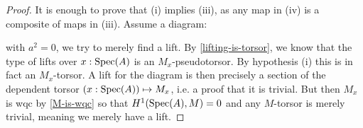 \begin{proof}
It is enough to prove that (i) implies (iii), as any map in (iv) is a composite of maps in (iii). Assume a diagram:
 \begin{center}
    \end{center} 
    with $a^2=0$, we try to merely find a lift. By \cref{lifting-is-torsor}, we know that the type of lifts over $x:\operatorname{Spec}(A)$ is an $M_x$-pseudotorsor. By hypothesis (i) this is in fact an $M_x$-torsor. A lift for the diagram is then precisely a section of the dependent torsor $(x:\operatorname{Spec}(A))\mapsto M_x$, i.e. a proof that it is trivial. But then $M_x$ is wqc by \cref{M-is-wqc} so that $H^1(\operatorname{Spec}(A),M)=0$ and any $M$-torsor is merely trivial, meaning we merely have a lift.
\end{proof}

